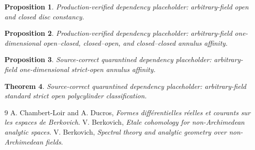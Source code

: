 \documentclass[11pt]{article}
\newtheorem{proposition}{Proposition}
\newtheorem{theorem}[proposition]{Theorem}
\begin{document}
\begin{proposition}\label{prop:p062-arbitrary-field-disc}
Production-verified dependency placeholder: arbitrary-field open and closed
disc constancy.
\end{proposition}
\begin{proposition}\label{prop:p062-annulus-endpoint-arbitrary-field}
Production-verified dependency placeholder: arbitrary-field one-dimensional
open--closed, closed--open, and closed--closed annulus affinity.
\end{proposition}
\begin{proposition}\label{prop:p062-arbitrary-field-annulus-v4-source-correct}
Source-correct quarantined dependency placeholder: arbitrary-field
one-dimensional strict-open annulus affinity.
\end{proposition}
\begin{theorem}\label{thm:p062-arbitrary-field-polycylinder-v4-source-correct}
Source-correct quarantined dependency placeholder: arbitrary-field standard
strict open polycylinder classification.
\end{theorem}
\raggedright


\begin{thebibliography}{9}
A. Chambert-Loir and A. Ducros,
\emph{Formes diff\'erentielles r\'eelles et courants sur les espaces de
Berkovich}.
V. Berkovich,
\emph{Etale cohomology for non-Archimedean analytic spaces}.
V. Berkovich,
\emph{Spectral theory and analytic geometry over non-Archimedean fields}.
\end{thebibliography}
\end{document}
